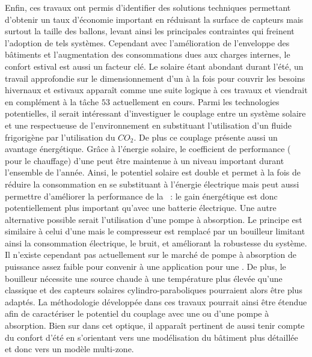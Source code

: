 Enfin, ces travaux ont permis d’identifier des solutions techniques permettant d’obtenir un taux
d’économie important en réduisant la surface de capteurs mais surtout la taille des
ballons, levant ainsi les principales contraintes qui freinent l’adoption de tels
systèmes. Cependant avec l’amélioration de l’enveloppe des bâtiments et l’augmentation des
consommations dues aux charges internes, le confort estival est aussi un facteur clé. Le
solaire étant abondant durant l’été, un travail approfondie sur le dimensionnement d’un
 à la fois pour couvrir les besoins hivernaux et estivaux apparaît comme une suite
logique à ces travaux et viendrait en complément à la tâche $53$ actuellement en cours.
Parmi les technologies potentielles, il serait intéressant d’investiguer le couplage entre
un système solaire et une  respectueuse de l’environnement en substituant
l’utilisation d’un fluide frigorigène par l’utilisation du $CO_{2}$. De plus ce couplage présente aussi un
avantage énergétique. Grâce à l’énergie solaire,
le coefficient de performance ( pour le chauffage) d’une  peut être maintenue à un niveau important durant
l’ensemble de l’année. Ainsi, le potentiel solaire est double et permet à la fois de
réduire la consommation en se substituant à l’énergie électrique mais peut aussi permettre d’améliorer
la performance de la ~: le gain énergétique est donc potentiellement plus
important qu’avec une batterie électrique. Une autre alternative possible serait
l’utilisation d’une pompe à absorption. Le principe est similaire à celui d’une 
mais le compresseur est remplacé par un bouilleur limitant ainsi la consommation
électrique, le bruit, et améliorant la robustesse du système. Il n’existe cependant pas
actuellement sur le marché de pompe à absorption de puissance assez faible pour convenir à
une application pour une . De plus, le bouilleur nécessite une source chaude à
une température plus élevée qu’une  classique et des capteurs solaires
cylindro-paraboliques pourraient alors être plus adaptés. La méthodologie développée dans ces travaux
pourrait ainsi être étendue afin de caractériser le potentiel du couplage avec une
 ou d’une pompe à absorption. Bien sur dans cet optique, il apparaît pertinent de
aussi tenir compte du confort d’été en s’orientant vers une modélisation du bâtiment plus
détaillée et donc vers un modèle multi-zone.
